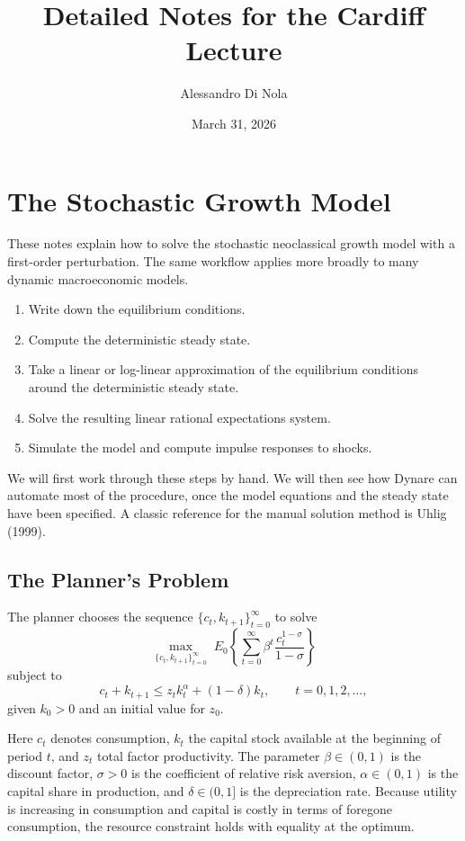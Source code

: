 \documentclass[12pt]{article}
\begin{document}
\title{Detailed Notes for the Cardiff Lecture}
\author{Alessandro Di Nola}
\date{March 31, 2026}
\maketitle

\section{The Stochastic Growth Model}

These notes explain how to solve the stochastic neoclassical growth model with a first-order perturbation. The same workflow applies more broadly to many dynamic macroeconomic models.

\begin{enumerate}
\item Write down the equilibrium conditions.
\item Compute the deterministic steady state.
\item Take a linear or log-linear approximation of the equilibrium conditions around the deterministic steady state.
\item Solve the resulting linear rational expectations system.
\item Simulate the model and compute impulse responses to shocks.
\end{enumerate}

We will first work through these steps by hand. We will then see how Dynare can automate most of the procedure, once the model equations and the steady state have been specified. A classic reference for the manual solution method is Uhlig (1999).

\subsection{The Planner's Problem}

The planner chooses the sequence $\{c_t,k_{t+1}\}_{t=0}^{\infty}$ to solve
\begin{equation*}
\max_{\{c_t,k_{t+1}\}_{t=0}^{\infty}}
\;
E_0\left\{\sum_{t=0}^{\infty}\beta^t \frac{c_t^{1-\sigma}}{1-\sigma}\right\}
\end{equation*}
subject to
\begin{equation*}
c_t + k_{t+1} \le z_t k_t^\alpha + (1-\delta)k_t,
\qquad t=0,1,2,\dots,
\end{equation*}
given $k_0>0$ and an initial value for $z_0$.

Here $c_t$ denotes consumption, $k_t$ the capital stock available at the beginning of period $t$, and $z_t$ total factor productivity. The parameter $\beta \in (0,1)$ is the discount factor, $\sigma > 0$ is the coefficient of relative risk aversion, $\alpha \in (0,1)$ is the capital share in production, and $\delta \in (0,1]$ is the depreciation rate. Because utility is increasing in consumption and capital is costly in terms of foregone consumption, the resource constraint holds with equality at the optimum.
\end{document}

